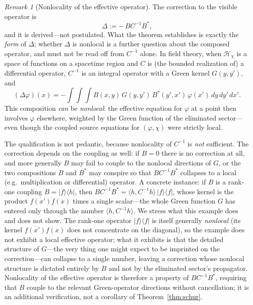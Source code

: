 \documentclass[11pt,reqno]{amsart}
\numberwithin{equation}{section}
\theoremstyle{plain}
\theoremstyle{definition}
\theoremstyle{remark}
\newtheorem{remark}[theorem]{Remark}
\newcommand{\inner}[2]{\langle #1 , #2 \rangle}
\begin{document}
\begin{remark}[Nonlocality of the effective operator]
\label{rem:nonlocal}
The correction to the visible operator is
\begin{equation}
\label{eq:correction}
\Delta:=-\,BC^{-1}B^{*} ,
\end{equation}
and it is derived---not postulated. What the theorem establishes is exactly the \emph{form} of
$\Delta$; whether $\Delta$ is nonlocal is a further question about the composed operator, and
must not be read off from $C^{-1}$ alone. In field theory, when $\mathcal{H}_{\chi}$ is a
space of functions on a spacetime region and $C$ is (the bounded realization of) a differential
operator, $C^{-1}$ is an integral operator with a Green kernel $G(y,y')$, and
\[
(\Delta\varphi)(x)=-\int\!\!\int\!\!\int B(x,y)\,G(y,y')\,B^{*}(y',x')\,\varphi(x')\,dy\,dy'\,dx' .
\]
This composition \emph{can} be \emph{nonlocal}: the effective equation for
$\varphi$ at a point then involves $\varphi$ elsewhere, weighted by the Green function of the
eliminated sector---even though the coupled source equations for $(\varphi,\chi)$ were strictly
local.

The qualification is not pedantic, because nonlocality of $C^{-1}$ is \emph{not} sufficient. The
correction depends on the coupling as well: if $B=0$ there is no correction at all, and more
generally $B$ may fail to couple to the nonlocal directions of $G$, or the two compositions
$B$ and $B^{*}$ may conspire so that $BC^{-1}B^{*}$ collapses to a local (e.g.\ multiplication or
differential) operator. A concrete instance: if $B$ is a rank-one coupling
$B=\lvert f\rangle\langle h\rvert$, then $BC^{-1}B^{*}=\inner{h}{C^{-1}h}\,\lvert f\rangle\langle f\rvert$,
whose kernel is the product $\overline{f(x')}f(x)$ times a single scalar---the whole Green
function $G$ has entered only through the number $\inner{h}{C^{-1}h}$. We stress what this
example does and does not show. The rank-one operator $\lvert f\rangle\langle f\rvert$ is itself
generally \emph{nonlocal} (its kernel $\overline{f(x')}f(x)$ does not concentrate on the
diagonal), so the example does not exhibit a local effective operator; what it exhibits is that
the detailed structure of $G$---the very thing one might expect to be imprinted on the
correction---can collapse to a single number, leaving a correction whose nonlocal structure is
dictated entirely by $B$ and not by the eliminated sector's propagator. Nonlocality of the
effective operator is therefore a property
of $BC^{-1}B^{*}$, requiring that $B$ couple to the relevant Green-operator directions without
cancellation; it is an additional verification, not a corollary of Theorem~\ref{thm:schur}.


\end{remark}
\end{document}
